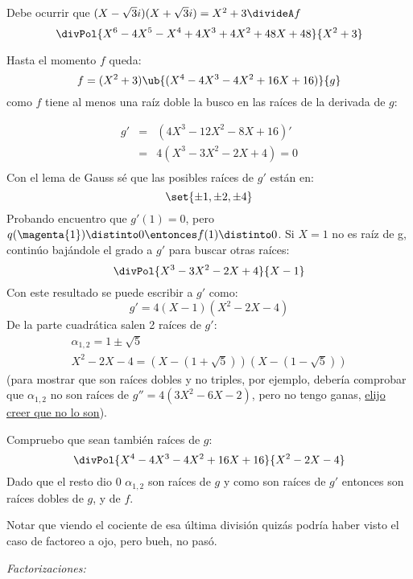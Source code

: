 \begin{enumerate}[label=\alph*)]
        Debe ocurrir que $(X - \sqrt{3}i)(X + \sqrt{3}i) = X^2 + 3 \divideA f$
        $$
          \divPol{X^6 - 4X^5 - X^4 + 4X^3 + 4X^2 + 48X + 48}{X^2 + 3}
        $$

        Hasta el momento $f$ queda:
        $$
          f = (X^2 + 3)\ub{(X^4 - 4X^3 - 4X^2 + 16X + 16)}{g}
        $$
        como $f$ tiene al menos una raíz doble la busco en las raíces de la derivada de $g$:\par
        $$
          \begin{array}{rcl}
            g' & = & (4X^3 - 12X^2 - 8 X + 16)' \\
               & = & 4(X^3 - 3X^2 - 2X + 4) = 0 \\
          \end{array}
        $$
        Con el lema de Gauss sé que las posibles raíces de $g'$ están en:
        $$
          \set{\pm1,\pm2,\pm4}
        $$
        Probando encuentro que  $g'(1) = 0$, pero $q(\magenta{1}) \distinto 0 \entonces f(1) \distinto 0$. Si $X=1$ no es raíz de g,
        continúo bajándole el grado a $g'$ para buscar otras raíces:
        $$
          \divPol{X^3 - 3X^2 - 2X + 4}{X - 1}
        $$
        Con este resultado se puede escribir a $g'$ como:
        $$
          g' = 4(X-1)(X^2 - 2X -4)
        $$
        De la parte cuadrática salen 2 raíces de $g'$:
        $$
          \begin{array}{c}
            \alpha_{1,2} = 1 \pm \sqrt{5} \\
            X^2 - 2X -4 = (X - (1 + \sqrt{5}))(X - (1 - \sqrt{5}))
          \end{array}
        $$
        {\tiny(para mostrar que son raíces dobles y no triples, por ejemplo, debería comprobar que $\alpha_{1,2}$ no son raíces de $g''=4(3X^2-6X-2)$, pero no tengo ganas,
            \href{\dontWorryAboutAThing}{elijo creer que no lo son}).}

        Compruebo que sean también raíces de $g$:
        $$
          \divPol{X^4 - 4X^3 - 4X^2 + 16X + 16}{X^2 - 2X -4}
        $$
        Dado que el resto dio 0 $\alpha_{1,2}$ son raíces de $g$ y como son raíces de $g'$ entonces son raíces dobles de $g$, y de $f$.

        Notar que viendo el cociente de esa última división quizás podría haber visto el caso de factoreo a ojo, pero bueh, no pasó.

        \textit{Factorizaciones: }
        \begin{center}
        \end{center}
\end{enumerate}

\begin{aportes}
  \item {}
\end{aportes}
